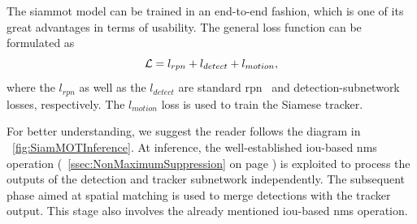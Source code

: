 The \gls{siammot} model can be trained in an end-to-end fashion, which is one of its great advantages in terms of usability. The general loss function can be formulated as
\begin{equation}
    \label{eq:SiamMOTGeneralLoss}
    \mathcal{L} = l_{rpn} + l_{detect} + l_{motion},
\end{equation}
where the $l_{rpn}$ as well as the $l_{detect}$ are standard \gls{rpn}~\cite{ren2017fasterrcnn} and detection-subnetwork~\cite{girshick2015fast} losses, respectively. The $l_{motion}$ loss is used to train the Siamese tracker.

For better understanding, we suggest the reader follows the diagram in \figtext{}~\ref{fig:SiamMOTInference}. At inference, the well-established \gls{iou}-based \gls{nms} operation (\sectiontext{}~\ref{ssec:NonMaximumSuppression} on page \pageref{ssec:NonMaximumSuppression}) is exploited to process the outputs of the detection and tracker subnetwork independently. The subsequent phase aimed at spatial matching is used to merge detections with the tracker output. This stage also involves the already mentioned \gls{iou}-based \gls{nms} operation.


